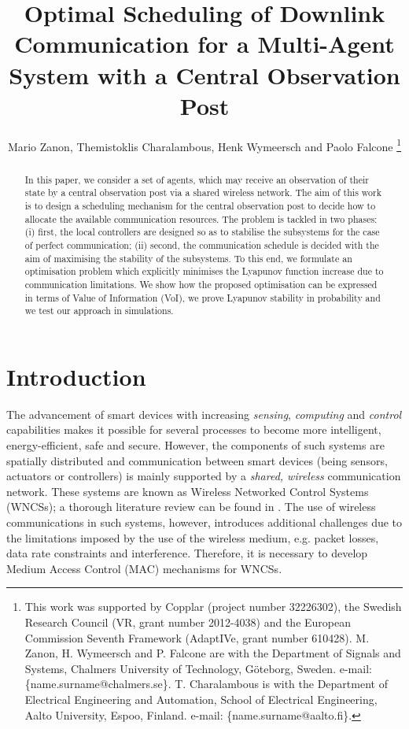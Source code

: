 \documentclass[letterpaper, 10 pt, conference]{ieeeconf}  %
\title{\LARGE \bf {Optimal Scheduling of Downlink Communication for a Multi-Agent System with a Central  Observation Post}}
\author{Mario Zanon, Themistoklis Charalambous, Henk Wymeersch and Paolo Falcone%
\thanks{This work was supported by Copplar (project number 32226302), the Swedish Research Council (VR, grant number 2012-4038) and the European Commission Seventh Framework (AdaptIVe, grant number 610428).
M. Zanon, H. Wymeersch and P. Falcone are with the Department of Signals and Systems, Chalmers University of Technology, G\"{o}teborg, Sweden. e-mail: \{name.surname@chalmers.se\}.
T. Charalambous is with the Department of Electrical Engineering and Automation, School of Electrical Engineering, Aalto University, Espoo, Finland. e-mail: \{name.surname@aalto.fi\}.}%
}
\begin{document}
\maketitle
\thispagestyle{empty}
\pagestyle{empty}



%
%
%
%
\begin{abstract}
In this paper, we consider a set of agents, which may receive an observation of their state by a central observation post via a shared wireless network. The aim of this work is to design a scheduling mechanism for the central observation post to decide how to allocate the available communication resources. The problem is tackled in two phases: (i) first, the local controllers are designed so as to stabilise the subsystems for the case of perfect communication; (ii) second, the communication schedule is decided with the aim of maximising the stability of the subsystems. To this end, we formulate an optimisation problem which explicitly minimises the Lyapunov function increase due to communication limitations. We show how the proposed optimisation can be expressed in terms of Value of Information (VoI), %
we prove Lyapunov stability in probability and we test our approach in simulations.
\end{abstract}


%
%
%
%
\section{Introduction}\label{sec:intro}

The advancement of smart devices with increasing \emph{sensing}, \emph{computing} and \emph{control} capabilities makes it possible for several processes to become more intelligent, energy-efficient, safe and secure. However, the components of such systems are spatially distributed and communication between smart devices (being sensors, actuators or controllers) is mainly supported by a \emph{shared, wireless} communication network. These systems are known as Wireless Networked Control Systems (WNCSs); a thorough literature review can be found in \cite{Gupta2010,Zhang2013}. The use of wireless communications in such systems, however, introduces additional challenges due to the limitations imposed by the use of the wireless medium, e.g. packet losses, data rate constraints and interference. Therefore, it is necessary to develop Medium Access Control (MAC) mechanisms for WNCSs.
\end{document}
